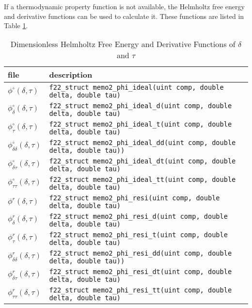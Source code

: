 \documentclass[oneside]{book}
\begin{document}
If a thermodynamic property function is not available, the Helmholtz free energy and derivative functions can be used to calculate it.  These functions are listed in Table \ref{table:props_dt_phi}.

\begin{table}[h!]
\centering
\caption{Dimensionless Helmholtz Free Energy and Derivative Functions of $\delta$ and $\tau$}
\begin{tabular}{ l l }
\hline
file & description \\
\hline
\hline
$\phi^\circ(\delta, \tau)$ & \texttt{f22\_struct memo2\_phi\_ideal(uint comp, double delta, double tau)}  \\ [1ex]
$\phi^\circ_\delta(\delta, \tau)$ & \texttt{f22\_struct memo2\_phi\_ideal\_d(uint comp, double delta, double tau)}  \\ [1ex]
$\phi^\circ_\tau(\delta, \tau)$ & \texttt{f22\_struct memo2\_phi\_ideal\_t(uint comp, double delta, double tau)}  \\ [1ex]
$\phi^\circ_{\delta\delta}(\delta, \tau)$ & \texttt{f22\_struct memo2\_phi\_ideal\_dd(uint comp, double delta, double tau))}  \\ [1ex]
$\phi^\circ_{\delta\tau}(\delta, \tau)$ & \texttt{f22\_struct memo2\_phi\_ideal\_dt(uint comp, double delta, double tau)}   \\ [1ex]
$\phi^\circ_{\tau\tau}(\delta, \tau)$ & \texttt{f22\_struct memo2\_phi\_ideal\_tt(uint comp, double delta, double tau)}  \\ [1ex]
$\phi^r(\delta, \tau)$ & \texttt{f22\_struct memo2\_phi\_resi(uint comp, double delta, double tau)}  \\ [1ex]
$\phi^r_\delta(\delta, \tau)$ & \texttt{f22\_struct memo2\_phi\_resi\_d(uint comp, double delta, double tau)}  \\ [1ex]
$\phi^r_\tau(\delta, \tau)$ & \texttt{f22\_struct memo2\_phi\_resi\_t(uint comp, double delta, double tau)}  \\ [1ex]
$\phi^r_{\delta\delta}(\delta, \tau)$ & \texttt{f22\_struct memo2\_phi\_resi\_dd(uint comp, double delta, double tau))}  \\ [1ex]
$\phi^r_{\delta\tau}(\delta, \tau)$ & \texttt{f22\_struct memo2\_phi\_resi\_dt(uint comp, double delta, double tau)}   \\ [1ex]
$\phi^r_{\tau\tau}(\delta, \tau)$ & \texttt{f22\_struct memo2\_phi\_resi\_tt(uint comp, double delta, double tau)}  \\ [1ex]
 \hline    
\end{tabular}
\label{table:props_dt_phi}
\end{table}
\end{document}
